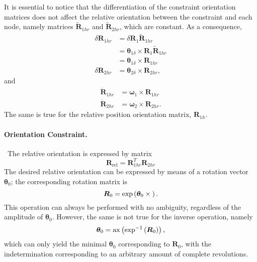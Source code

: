 \documentclass[10pt,dvips,fleqn,subeqn]{report}
\newcommand{\T}[1]{\bm{#1}}
\begin{document}
It is essential to notice that the differentiation of the constraint
orientation matrices does not affect the relative orientation between
the constraint and each node, namely matrices $\tilde{\T{R}}_{1hr}$
and $\tilde{\T{R}}_{2hr}$, which are constant.
As a consequence,
\begin{subequations}
\begin{align}
	\delta\T{R}_{1hr}
		&= \delta\T{R}_1 \tilde{\T{R}}_{1hr} \nonumber \\
		&= \T{\theta}_{1\delta} \times \T{R}_1 \tilde{\T{R}}_{1hr} \nonumber \\
		&= \T{\theta}_{1\delta}\times \T{R}_{1hr} \\
	\delta\T{R}_{2hr} &= \T{\theta}_{2\delta}\times \T{R}_{2hr} ,
\end{align}
\end{subequations}
and
\begin{align}
	\dot{\T{R}}_{1hr} &= \T{\omega}_1 \times \T{R}_{1hr} \\
	\dot{\T{R}}_{2hr} &= \T{\omega}_2 \times \T{R}_{2hr} .
\end{align}
The same is true for the relative position orientation matrix,
$\T{R}_{1h}$.


\paragraph{Orientation Constraint.} \
The relative orientation is expressed by matrix
\begin{equation}
	\T{R}_{\mathrm{rel}} = \T{R}_{1hr}^T \T{R}_{2hr}
\end{equation}
The desired relative orientation can be expressed by means
of a rotation vector $\T{\theta}_0$;
the corresponding rotation matrix is
\begin{equation}
	\T{R}_0 = \exp\plbr{\T{\theta}_0\times{}} .
\end{equation}
This operation can always be performed with no ambiguity,
regardless of the amplitude of $\T{\theta}_0$.
However, the same is not true for the inverse operation, namely
\begin{equation}
	\T{\theta}_0 = \mathrm{ax}\plbr{\exp^{-1}\plbr{\T{R}_0}} ,
\end{equation}
which can only yield the minimal $\T{\theta}_0$ corresponding
to $\T{R}_0$,
with the indetermination corresponding to an arbitrary amount 
of complete revolutions.
\end{document}
